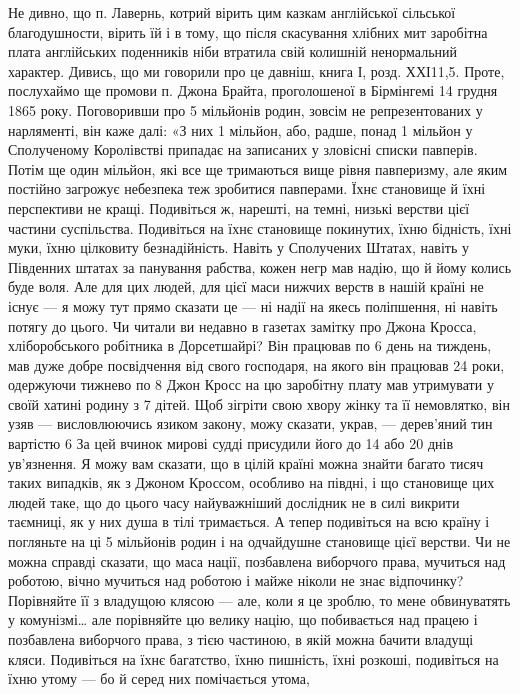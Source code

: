 Не дивно, що п. Лавернь, котрий вірить цим казкам англійської сільської
благодушности, вірить їй і в тому, що після скасування хлібних мит заробітна плата
англійських поденників ніби втратила свій колишній ненормальний характер.
Дивись, що ми говорили про це давніш, книга І, розд. ХХІ11,5. Проте, послухаймо
ще промови п. Джона Брайта, проголошеної в Бірмінгемі 14 грудня 1865 року.
Поговоривши про 5 мільйонів родин, зовсім не репрезентованих у нарляменті,
він каже далі: «З них 1 мільйон, або, радше, понад 1 мільйон у Сполученому
Королівстві припадає на записаних у зловісні списки павперів. Потім ще один
мільйон, які все ще тримаються вище рівня павперизму, але яким постійно
загрожує небезпека теж зробитися павперами. Їхнє становище й їхні перспективи
не кращі. Подивіться ж, нарешті, на темні, низькі верстви цієї частини суспільства.
Подивіться на їхнє становище покинутих, їхню бідність, їхні муки, їхню цілковиту
безнадійність. Навіть у Сполучених Штатах, навіть у Південних штатах за
панування рабства, кожен негр мав надію, що й йому колись буде воля.
Але для цих людей, для цієї маси нижчих верств в нашій країні не існує —
я можу тут прямо сказати це — ні надії на якесь поліпшення, ні навіть
потягу до цього. Чи читали ви недавно в газетах замітку про Джона Кросса,
хліборобського робітника в Дорсетшайрі? Він працював по 6 день на тиждень,
мав дуже добре посвідчення від свого господаря, на якого він працював 24 роки,
одержуючи тижнево по 8 Джон Кросс на цю заробітну плату мав
утримувати у своїй хатині родину з 7 дітей. Щоб зігріти свою хвору жінку та
її немовлятко, він узяв — висловлюючись язиком закону, можу сказати, украв, —
дерев’яний тин вартістю 6 За цей вчинок мирові судді присудили його
до 14 або 20 днів ув’язнення. Я можу вам сказати, що в цілій країні можна
знайти багато тисяч таких випадків, як з Джоном Кроссом, особливо на півдні,
і що становище цих людей таке, що до цього часу найуважніший дослідник не
в силі викрити таємниці, як у них душа в тілі тримається. А тепер подивіться
на всю країну і погляньте на ці 5 мільйонів родин і на одчайдушне становище
цієї верстви. Чи не можна справді сказати, що маса нації, позбавлена
виборчого права, мучиться над роботою, вічно мучиться над роботою і майже
ніколи не знає відпочинку? Порівняйте її з владущою клясою — але, коли я це
зроблю, то мене обвинуватять у комунізмі\dots{} але порівняйте цю велику націю,
що побивається над працею і позбавлена виборчого права, з тією частиною,
в якій можна бачити владущі кляси. Подивіться на їхнє багатство, їхню пишність,
їхні розкоші, подивіться на їхню утому — бо й серед них помічається утома,
\parbreak{}  %
